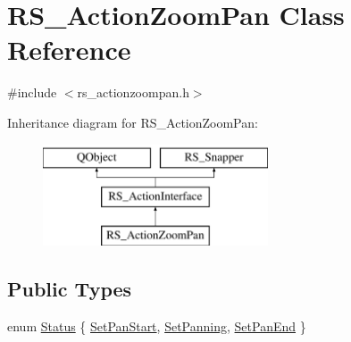 \hypertarget{classRS__ActionZoomPan}{\section{R\-S\-\_\-\-Action\-Zoom\-Pan Class Reference}
\label{classRS__ActionZoomPan}
}


{\ttfamily \#include $<$rs\-\_\-actionzoompan.\-h$>$}

Inheritance diagram for R\-S\-\_\-\-Action\-Zoom\-Pan\-:\begin{figure}[H]
\begin{center}
\leavevmode
\includegraphics[height=3.000000cm]{classRS__ActionZoomPan}
\end{center}
\end{figure}
\subsection*{Public Types}
\begin{DoxyCompactItemize}
\item 
enum \hyperlink{classRS__ActionZoomPan_a02fe9b6dc421e08cfbc9028d7cc39437}{Status} \{ \hyperlink{classRS__ActionZoomPan_a02fe9b6dc421e08cfbc9028d7cc39437a64d9c460965ead9f214441bf89dfd59a}{Set\-Pan\-Start}, 
\hyperlink{classRS__ActionZoomPan_a02fe9b6dc421e08cfbc9028d7cc39437a7cc5d1d6d9d566e5ed832cdf424aa8a7}{Set\-Panning}, 
\hyperlink{classRS__ActionZoomPan_a02fe9b6dc421e08cfbc9028d7cc39437a5423106a26940d1129ca897a29400789}{Set\-Pan\-End}
 \}
\end{DoxyCompactItemize}
